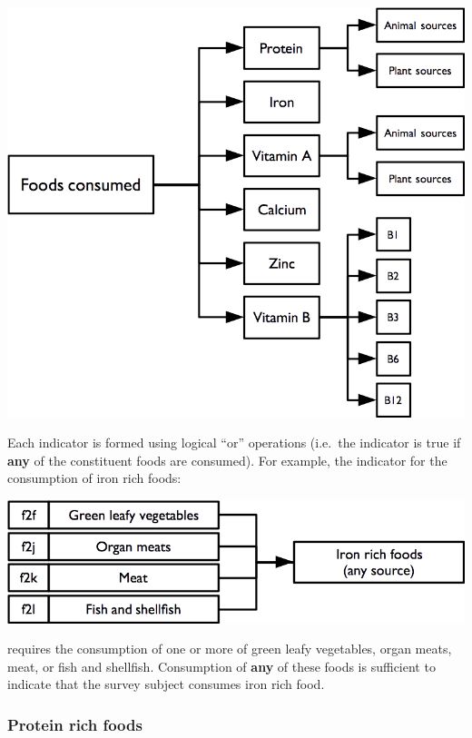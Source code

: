 \documentclass[12pt,a4paper]{book}
\theoremstyle{definition}
\theoremstyle{definition}
\theoremstyle{definition}
\theoremstyle{remark}
\begin{document}
\begin{center}\includegraphics[width=800pt]{figures/indicators07} \end{center}

Each indicator is formed using logical ``or'' operations (i.e.~the
indicator is true if \textbf{any} of the constituent foods are
consumed). For example, the indicator for the consumption of iron rich
foods:

\begin{center}\includegraphics[width=800pt]{figures/indicators08} \end{center}

requires the consumption of one or more of green leafy vegetables, organ
meats, meat, or fish and shellfish. Consumption of \textbf{any} of these
foods is sufficient to indicate that the survey subject consumes iron
rich food.

\hypertarget{protein-rich-foods}{%
\subsubsection{Protein rich foods}\label{protein-rich-foods}}
\end{document}
